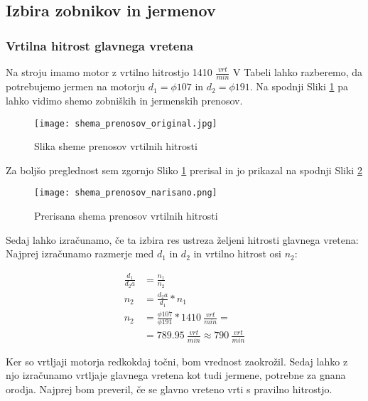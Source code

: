 \subsection{Izbira zobnikov in jermenov}
\subsubsection{Vrtilna hitrost glavnega vretena}
Na stroju imamo motor z vrtilno hitrostjo 1410 \( \frac{vrt}{min} \)
V Tabeli  lahko razberemo, da potrebujemo jermen na motorju
\( d_1 = \phi 107 \) in \( d_2 = \phi 191 \).
Na spodnji Sliki \ref{slika_prenosov} pa lahko vidimo shemo
zobniških in jermenskih prenosov.

\begin{figure}[H]
	\begin{center}
		\texttt{[image: shema\_prenosov\_original.jpg]}
		\caption{Slika sheme prenosov vrtilnih hitrosti
			\cite{gauthier}}
		\label{slika_prenosov}
	\end{center}
\end{figure}

Za boljšo preglednost sem zgornjo Sliko \ref{slika_prenosov}
prerisal in jo prikazal na spodnji Sliki \ref{skica_prenosov}

\begin{figure}[H]
	\begin{center}
		\texttt{[image: shema\_prenosov\_narisano.png]}
		\caption{Prerisana shema prenosov vrtilnih hitrosti
			\cite{lasten}}
		\label{skica_prenosov}
	\end{center}
\end{figure}

Sedaj lahko izračunamo, če ta izbira res ustreza željeni hitrosti glavnega vretena:
Najprej izračunamo razmerje med \( d_1 \) in \( d_2 \) in vrtilno hitrost osi \(n_2\):

\begin{equation}
	\label{eq:8}
	\begin{split}
		\frac{d_1}{d_2a} &= \frac{n_1}{n_2} \\
		n_2 &= \frac{d_2a}{d_1} * n_1 \\
		n_2 &= \frac{\phi 107}{\phi 191} * 1410\ \frac{vrt}{min} = \\
		&= 789.95\ \frac{vrt}{min} \approx 790\ \frac{vrt}{min}
	\end{split}
\end{equation}

Ker so vrtljaji motorja redkokdaj točni, bom vrednost zaokrožil. Sedaj
lahko z njo izračunamo vrtljaje glavnega vretena kot tudi jermene,
potrebne za gnana orodja. Najprej bom preveril, če se glavno vreteno vrti s
pravilno hitrostjo.

